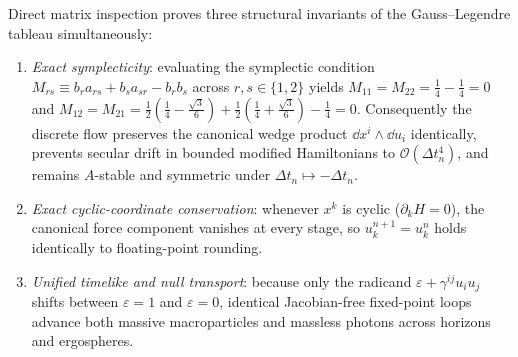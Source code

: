 Direct matrix inspection proves three structural invariants of the Gauss--Legendre tableau simultaneously:
\begin{enumerate}
\item \emph{Exact symplecticity}: evaluating the symplectic condition $M_{rs} \equiv b_r a_{rs} + b_s a_{sr} - b_r b_s$ across $r, s \in \{1, 2\}$ yields $M_{11} = M_{22} = \frac{1}{4} - \frac{1}{4} = 0$ and $M_{12} = M_{21} = \frac{1}{2}(\frac{1}{4}-\frac{\sqrt{3}}{6}) + \frac{1}{2}(\frac{1}{4}+\frac{\sqrt{3}}{6}) - \frac{1}{4} = 0$. Consequently the discrete flow preserves the canonical wedge product $\dd x^i \wedge \dd u_i$ identically, prevents secular drift in bounded modified Hamiltonians to $\mathcal{O}(\Delta t_n^4)$, and remains $A$-stable and symmetric under $\Delta t_n \mapsto -\Delta t_n$.
\item \emph{Exact cyclic-coordinate conservation}: whenever $x^k$ is cyclic ($\partial_k H = 0$), the canonical force component vanishes at every stage, so $u_k^{n+1} = u_k^n$ holds identically to floating-point rounding.
\item \emph{Unified timelike and null transport}: because only the radicand $\varepsilon + \gamma^{ij}u_i u_j$ shifts between $\varepsilon = 1$ and $\varepsilon = 0$, identical Jacobian-free fixed-point loops advance both massive macroparticles and massless photons across horizons and ergospheres.
\end{enumerate}

